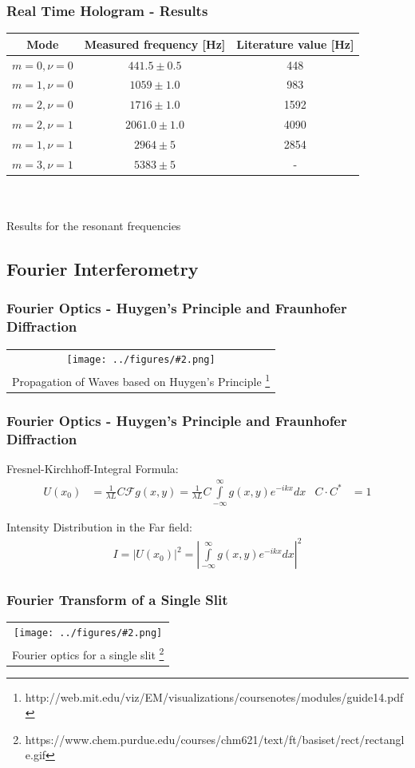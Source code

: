 \documentclass{beamer}
\newcommand{\gra}[3][]{
	\begin{table}
	\centering
	\begin{tabular}[width=\textwidth]{c}
		\texttt{[image: ../figures/\#2.png]}\\
		\small #3
	\end{tabular}
	\end{table}
}
\begin{document}
\begin{frame}
	\frametitle{Real Time Hologram - Results}
	\begin{table}
		\centering
		\begin{tabular}{c|c|c}
			Mode 		& Measured frequency [Hz] 	& Literature value [Hz]\\ \hline\hline
			$m=0,\nu=0$	& $441.5\pm0.5$					& 448	\\ \hline
			$m=1,\nu=0$	& $1059\pm1.0$				& 983	\\ \hline
			$m=2,\nu=0$	& $1716\pm1.0$				& 1592	\\ \hline
			$m=2,\nu=1$	& $2061.0\pm1.0$				& 4090	\\ \hline
			$m=1,\nu=1$	& $2964\pm5$				& 2854 \\ \hline
			$m=3,\nu=1$	& $5383\pm5$				&-
		\end{tabular}\\\scriptsize\ \\\small
		{Results for the resonant frequencies}
	\end{table}
\end{frame}

\subsection{Fourier Interferometry}
\frame{\tableofcontents[currentsubsection]}
\begin{frame}
	\frametitle{Fourier Optics - Huygen's Principle and Fraunhofer Diffraction}
	\gra{Huygen}{Propagation of Waves based on Huygen's Principle \footnote{http://web.mit.edu/viz/EM/visualizations/coursenotes/modules/guide14.pdf}}
\end{frame}
\begin{frame}
	\frametitle{Fourier Optics - Huygen's Principle and Fraunhofer Diffraction}
	
	Fresnel-Kirchhoff-Integral Formula:
	\begin{align}
	U(x_0) &= \frac{1}{\lambda L} C \mathscr{F}{g(x, y)}    = \frac{1}{\lambda L} C   \int\limits_{-\infty}^{\infty}  g(x,y)e^{-ikx}dx    &  C  \cdot C^* &= 1       
	\end{align}
	
	Intensity Distribution in the Far field:
	\begin{align}
	I=|U(x_0)|^2=\left| \int\limits_{-\infty}^{\infty} g(x,y)e^{-ikx}dx \right|^2
	\end{align}
\end{frame}
\begin{frame}
	\frametitle{Fourier Transform of a Single Slit}
\gra[0.8]{Einzelspalt}{Fourier optics for a single slit \footnote{https://www.chem.purdue.edu/courses/chm621/text/ft/basiset/rect/rectangle.gif}}
\end{frame}
\end{document}
